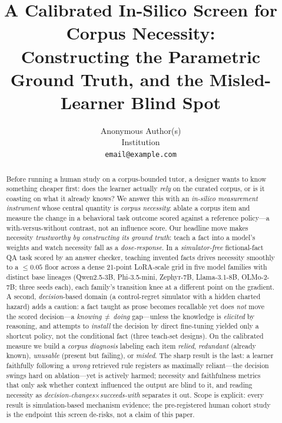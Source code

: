 \documentclass{article}
\title{A Calibrated In-Silico Screen for Corpus Necessity:\\
Constructing the Parametric Ground Truth, and the Misled-Learner Blind Spot}
\author{Anonymous Author(s)\\Institution\\\texttt{email@example.com}}
\begin{document}
\maketitle

\begin{abstract}
Before running a human study on a corpus-bounded tutor, a designer wants to know something cheaper
first: does the learner actually \emph{rely} on the curated corpus, or is it coasting on what it
already knows? We answer this with an \emph{in-silico measurement instrument} whose central quantity
is \emph{corpus necessity}: ablate a corpus item and measure the change in a behavioral task outcome
scored against a reference policy---a with-versus-without contrast, not an influence score. Our
headline move makes necessity \emph{trustworthy by constructing its ground truth}: teach a fact into
a model's weights and watch necessity fall as a \emph{dose-response}. In a \emph{simulator-free}
fictional-fact QA task scored by an answer checker, teaching invented facts drives necessity smoothly
to a $\le\!0.05$ floor across a dense 21-point LoRA-scale grid in five model families with distinct
base lineages (Qwen2.5-3B, Phi-3.5-mini, Zephyr-7B, Llama-3.1-8B, OLMo-2-7B; three seeds each), each
family's transition knee at a different point on the gradient. A second, \emph{decision}-based domain
(a control-regret simulator with a hidden charted hazard) adds a caution: a fact taught as prose
becomes recallable yet does \emph{not} move the scored decision---a \emph{knowing\,$\neq$\,doing}
gap---unless the knowledge is \emph{elicited} by reasoning, and attempts to \emph{install} the
decision by direct fine-tuning yielded only a shortcut policy, not the conditional fact (three
teach-set designs). On the calibrated measure we build a \emph{corpus diagnosis} labeling each item
\emph{relied}, \emph{redundant} (already known), \emph{unusable} (present but failing), or
\emph{misled}. The sharp result is the last: a learner faithfully following a \emph{wrong} retrieved
rule registers as maximally reliant---the decision swings hard on ablation---yet is actively harmed;
necessity and faithfulness metrics that only ask whether context influenced the output are blind to
it, and reading necessity as \emph{decision-changes}$\times$\emph{succeeds-with} separates it out.
Scope is explicit: every result is simulation-based mechanism evidence; the pre-registered human
cohort study is the endpoint this screen de-risks, not a claim of this paper.
\end{abstract}
\end{document}
